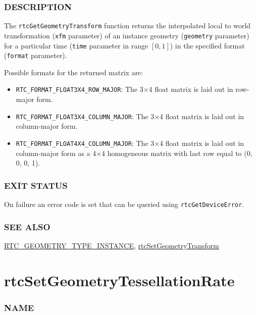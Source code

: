\subsubsection{DESCRIPTION}\label{description}

The \texttt{rtcGetGeometryTransform} function returns the interpolated
local to world transformation (\texttt{xfm} parameter) of an instance
geometry (\texttt{geometry} parameter) for a particular time
(\texttt{time} parameter in range \([0,1]\)) in the specified format
(\texttt{format} parameter).

Possible formats for the returned matrix are:

\begin{itemize}
\item
  \texttt{RTC\_FORMAT\_FLOAT3X4\_ROW\_MAJOR}: The 3×4 float matrix is
  laid out in row-major form.
\item
  \texttt{RTC\_FORMAT\_FLOAT3X4\_COLUMN\_MAJOR}: The 3×4 float matrix is
  laid out in column-major form.
\item
  \texttt{RTC\_FORMAT\_FLOAT4X4\_COLUMN\_MAJOR}: The 3×4 float matrix is
  laid out in column-major form as a 4×4 homogeneous matrix with last
  row equal to (0, 0, 0, 1).
\end{itemize}

\subsubsection{EXIT STATUS}\label{exit-status}

On failure an error code is set that can be queried using
\texttt{rtcGetDeviceError}.

\subsubsection{SEE ALSO}\label{see-also}

\hyperref[rtc_geometry_type_instance]{RTC\_GEOMETRY\_TYPE\_INSTANCE},
\hyperref[rtcsetgeometrytransform]{rtcSetGeometryTransform}

\pagebreak

\section{rtcSetGeometryTessellationRate}\label{rtcsetgeometrytessellationrate}

\subsubsection{NAME}\label{name}

